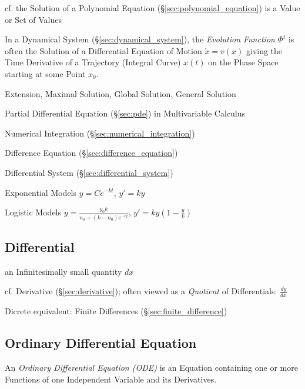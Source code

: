 \fist cf. the Solution of a Polynomial Equation
(\S\ref{sec:polynomial_equation}) is a Value or Set of Values

In a Dynamical System (\S\ref{sec:dynamical_system}), the \emph{Evolution
  Function} $\Phi^t$ is often the Solution of a Differential Equation of Motion
$\dot{x} = v(x)$ giving the Time Derivative of a Trajectory (Integral Curve)
$x(t)$ on the Phase Space starting at some Point $x_0$.

Extension, Maximal Solution, Global Solution, General Solution

\fist Partial Differential Equation (\S\ref{sec:pde}) in Multivariable Calculus

\fist Numerical Integration (\S\ref{sec:numerical_integration})

\fist Difference Equation (\S\ref{sec:difference_equation})

\fist Differential System (\S\ref{sec:differential_system})

Exponential Models $y = Ce^{-kt}$, $y' = ky$

Logistic Models $y = \frac{y_0 k}{n_0 + (k-n_0)e^{-rt}}$,
  $y' = ky (1 - \frac{y}{k})$



\subsection{Differential}\label{sec:differential}

an Infinitesimally small quantity $dx$

cf. Derivative (\S\ref{sec:derivative}); often viewed as a \emph{Quotient} of
Differentials: $\frac{dy}{dx}$

\fist Dicrete equivalent: Finite Differences (\S\ref{sec:finite_difference})



\subsection{Ordinary Differential Equation}\label{sec:ode}

An \emph{Ordinary Differential Equation (ODE)} is an Equation containing one or
more Functions of one Independent Variable and its Derivatives.

